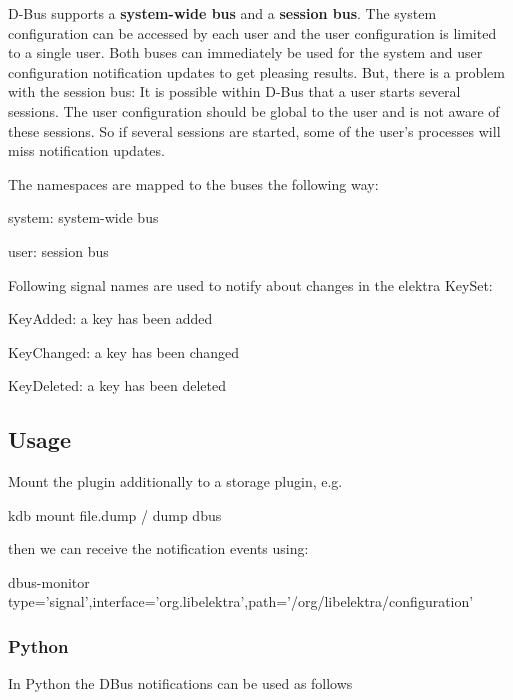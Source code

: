 D-\/\+Bus supports a {\bfseries system-\/wide bus} and a {\bfseries session bus}. The system configuration can be accessed by each user and the user configuration is limited to a single user. Both buses can immediately be used for the system and user configuration notification updates to get pleasing results. But, there is a problem with the session bus\+: It is possible within D-\/\+Bus that a user starts several sessions. The user configuration should be global to the user and is not aware of these sessions. So if several sessions are started, some of the user's processes will miss notification updates.

The namespaces are mapped to the buses the following way\+:


\begin{DoxyItemize}
\item system\+: system-\/wide bus
\item user\+: session bus
\end{DoxyItemize}

Following signal names are used to notify about changes in the elektra Key\+Set\+:
\begin{DoxyItemize}
\item Key\+Added\+: a key has been added
\item Key\+Changed\+: a key has been changed
\item Key\+Deleted\+: a key has been deleted
\end{DoxyItemize}

\subsection*{Usage}

Mount the plugin additionally to a storage plugin, e.\+g. \begin{DoxyVerb}    kdb mount file.dump / dump dbus
\end{DoxyVerb}


then we can receive the notification events using\+: \begin{DoxyVerb}    dbus-monitor type='signal',interface='org.libelektra',path='/org/libelektra/configuration'
\end{DoxyVerb}


\subsubsection*{Python}

In Python the D\+Bus notifications can be used as follows

